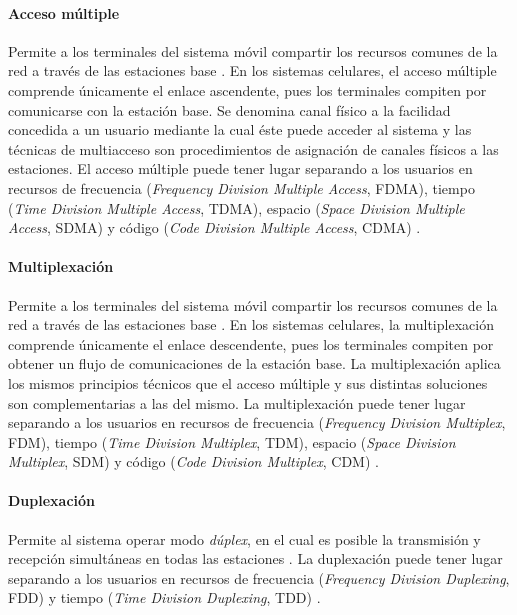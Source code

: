 \documentclass[12pt]{report} %
\begin{document}
\paragraph{Acceso múltiple}

Permite a los terminales del sistema móvil compartir los recursos comunes de la red a través de las estaciones base \cite{RefWorks:77}.
En los sistemas celulares, el acceso múltiple comprende únicamente el enlace ascendente, pues los terminales compiten por comunicarse con la estación base.
Se denomina canal físico a la facilidad concedida a un usuario mediante la cual éste puede acceder al sistema
y las técnicas de multiacceso son procedimientos de asignación de canales físicos a las estaciones.
El acceso múltiple puede tener lugar separando a los usuarios en recursos de frecuencia (\textit{Frequency Division Multiple Access}, FDMA), tiempo (\textit{Time Division Multiple Access}, TDMA), espacio (\textit{Space Division Multiple Access}, SDMA) y código (\textit{Code Division Multiple Access}, CDMA) \cite{RefWorks:78}.

\paragraph{Multiplexación}

Permite a los terminales del sistema móvil compartir los recursos comunes de la red a través de las estaciones base \cite{RefWorks:77}.
En los sistemas celulares, la multiplexación comprende únicamente el enlace descendente, pues los terminales compiten por obtener un flujo de comunicaciones de la estación base.
La multiplexación aplica los mismos principios técnicos que el acceso múltiple y sus distintas soluciones son complementarias a las del mismo.
La multiplexación puede tener lugar separando a los usuarios en recursos de frecuencia (\textit{Frequency Division Multiplex}, FDM), tiempo (\textit{Time Division Multiplex}, TDM), espacio (\textit{Space Division Multiplex}, SDM) y código (\textit{Code Division Multiplex}, CDM) \cite{RefWorks:78}.

\paragraph{Duplexación}

Permite al sistema operar modo \textit{dúplex}, en el cual es posible la transmisión y recepción simultáneas en todas las estaciones \cite{RefWorks:77}.
La duplexación puede tener lugar separando a los usuarios en recursos de frecuencia (\textit{Frequency Division Duplexing}, FDD) y tiempo (\textit{Time Division Duplexing}, TDD) \cite{RefWorks:78}.
\end{document}
